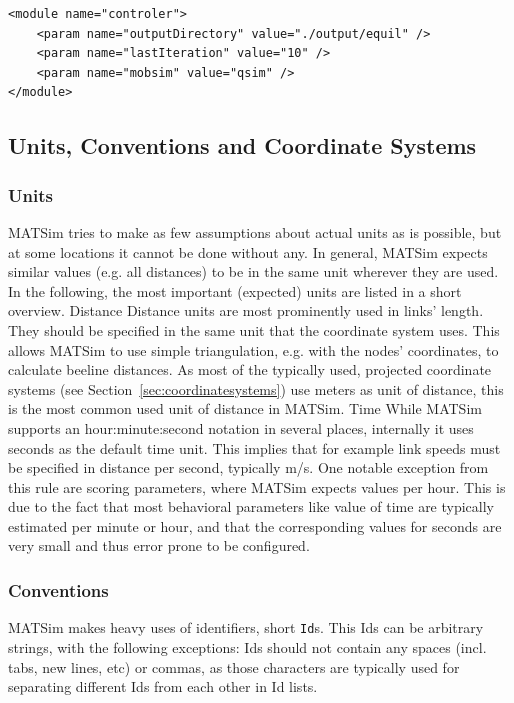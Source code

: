 \begin{lstlisting}
<module name="controler">
	<param name="outputDirectory" value="./output/equil" />
	<param name="lastIteration" value="10" />
	<param name="mobsim" value="qsim" />	
</module>
\end{lstlisting}

\subsection{Units, Conventions and Coordinate Systems}
\label{sec:unitsconventions}
\subsubsection{Units}
MATSim tries to make as few assumptions about actual units as is possible, but at some locations it cannot be done without any. In general, MATSim expects similar values (e.g. all distances) to be in the same unit wherever they are used. In the following, the most important (expected) units are listed in a short overview. Distance  Distance units are most prominently used in links' length. They should be specified in the same unit that the coordinate system uses. This allows MATSim to use simple triangulation, e.g. with the nodes' coordinates, to calculate beeline distances. As most of the typically used, projected coordinate systems (see Section~\ref{sec:coordinatesystems}) use meters as unit of distance, this is the most common used unit of distance in MATSim. Time  While MATSim supports an hour:minute:second notation in several places, internally it uses seconds as the default time unit. This implies that for example link speeds must be specified in distance per second, typically m/s. One notable exception from this rule are scoring parameters, where MATSim expects values per hour. This is due to the fact that most behavioral parameters like value of time are typically estimated per minute or hour, and that the corresponding values for seconds are very small and thus error prone to be configured. 

\subsubsection{Conventions}
MATSim makes heavy uses of identifiers, short \lstinline|Id|s. This Ids can be arbitrary strings, with the following exceptions: Ids should not contain any spaces (incl. tabs, new lines, etc) or commas, as those characters are typically used for separating different Ids from each other in Id lists. 

